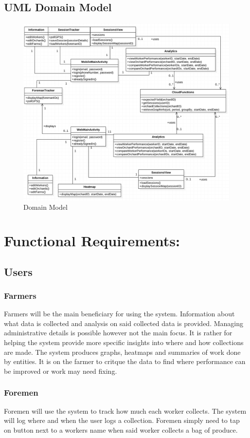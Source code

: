 \documentclass[11pt]{article}
\begin{document}
\newpage
\subsection{UML Domain Model}
\begin{figure}
 \centering
 \includegraphics[width=12cm, keepaspectratio]{UMLClassDiag.png}
 \caption{Domain Model}
 \label{DomainModel}
\end{figure}

\section{Functional Requirements:}
\subsection{Users}
\subsubsection{Farmers}
Farmers will be the main beneficiary for using the system. Information about what data is collected and analysis on said collected data is provided. Managing administrative details is possible however not the main focus. It is rather for helping the system provide more specific insights into where and how collections are made. The system produces graphs, heatmaps and summaries of work done by entities. It is on the farmer to critque the data to find where performance can be improved or work may need fixing.

\subsubsection{Foremen}
Foremen will use the system to track how much each worker collects. The system will log where and when the user logs a collection. Foremen simply need to tap on button next to a workers name when said worker collects a bag of produce.
\end{document}
